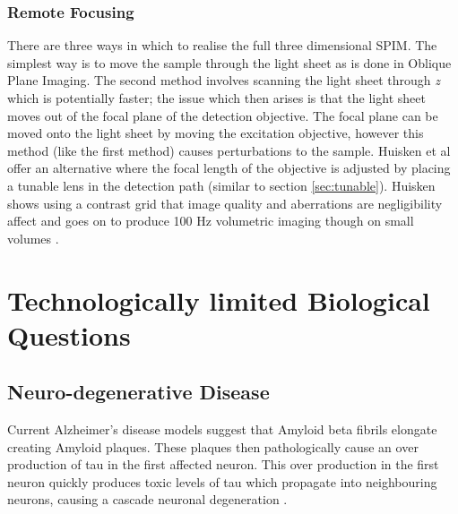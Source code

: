\subsubsection{Remote Focusing}

There are three ways in which to realise the full three dimensional SPIM. The simplest way is to move the sample through the light sheet as is done in Oblique Plane Imaging. The second method involves scanning the light sheet through \textit{z} which is potentially faster; the issue which then arises is that the light sheet moves out of the focal plane of the detection objective. The focal plane can be moved onto the light sheet by moving the excitation objective, however this method (like the first method) causes perturbations to the sample. Huisken et al offer an alternative where the focal length of the objective is adjusted by placing a tunable lens in the detection path (similar to section \ref{sec:tunable})\cite{Fahrbach2013}. %
Huisken shows using a contrast grid that image quality and aberrations are negligibility affect and goes on to produce 100 Hz volumetric imaging though on small volumes \cite{Fahrbach2013}.

\section{Technologically limited Biological Questions}



\subsection{Neuro-degenerative Disease}


Current Alzheimer's disease models suggest that Amyloid beta fibrils elongate creating Amyloid plaques. These plaques then pathologically cause an over production of tau in the first affected neuron. This over production in the first neuron quickly produces toxic levels of tau which propagate into neighbouring neurons, causing a cascade neuronal degeneration \cite{King2002}.

